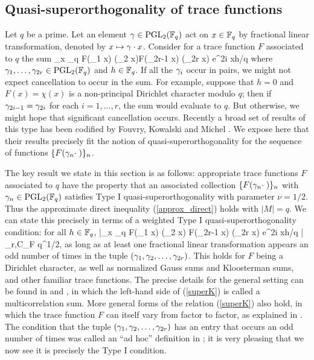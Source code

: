 \documentclass[oneside,11pt]{amsart}
\begin{document}
\subsection{Quasi-superorthogonality of trace functions}
  Let $q$ be a prime. Let an element $\gamma \in \mathrm{PGL}_2(\mathbb{F}_q)$
act on $x \in \mathbb{F}_q$ by fractional linear transformation, denoted by $x\mapsto \gamma \cdot x$. Consider for a trace function $F$ associated to $q$ the sum
\beq\label{multi}
 \sum_{x \in \F_q} F(\ga_1 \cdot x) (\ga_2 \cdot x)\cdots  F(\ga_{2r-1} \cdot x) (\ga_{2r} \cdot x)   e^{2\pi i xh/q} 
 \eeq
where $\gamma_1, \ldots, \gamma_{2r} \in  \mathrm{PGL}_2(\mathbb{F}_q)$ and $h \in \mathbb{F}_q$. 
If   all the $\gamma_i$ occur in pairs, we might not expect cancellation to occur in the sum. For example, suppose that $h=0$ and $F(x) = \chi(x)$ is a non-principal Dirichlet character modulo $q$; then if   $\gamma_{2i-1} = \gamma_{2i}$ for each $i=1,\ldots, r$, the sum would evaluate to $q$.
  But otherwise, we might hope that significant cancellation occurs. 
 Recently a broad set of results of this type has been codified by Fouvry, Kowalski and Michel \cite{FKM15}. 
We expose here that their results precisely fit the notion of quasi-superorthogonality for the sequence of functions $\{F(\gamma_n \cdot \; )\}_n$. 
  
The key result we state in this section is as follows:  appropriate  trace functions $F$ associated to $q$
have the property that an associated  collection $\{F(\gamma_n \cdot \; )\}_n$ with $\gamma_n \in \mathrm{PGL}_2(\mathbb{F}_q)$ satisfies Type I quasi-superorthogonality with parameter $\nu=1/2$. Thus the approximate direct inequality (\ref{approx_direct}) holds with $|M|=q$. 
We can state this precisely in terms of a weighted Type I quasi-superorthogonality condition:   
 for all $h \in \mathbb{F}_q$,
\beq\label{superK}
|\sum_{x \in \F_q} F(\ga_1 \cdot x) (\ga_2 \cdot x) \cdots  F(\ga_{2r-1} \cdot x) (\ga_{2r} \cdot x)   e^{2\pi i xh/q} |	\ll_{r,C_F} q^{1/2},
\eeq
 as long as at least one fractional linear transformation appears an odd number of times in the tuple $(\gamma_1,\gamma_2,\ldots, \gamma_{2r})$. 
 This holds for $F$ being a Dirichlet character, as well as normalized Gauss sums and Kloosterman sums, and other familiar trace functions. 
The precise details for the general setting can be found  in  \cite{FKM15} and \cite[\S 14]{FKMS19}, in which  the left-hand side of (\ref{superK}) is called a multicorrelation sum.  
More general forms of the relation (\ref{superK}) also hold, in which the trace function $F$ can itself vary from factor to factor, as explained in \cite{FKM15,FKMS19}.
The condition that the tuple $(\gamma_1,\gamma_2,\ldots, \gamma_{2r})$ has an entry that occurs an odd number of times  was called an ``ad hoc'' definition in \cite[Dfn. 14.2]{FKMS19}; it is very pleasing that we now see it is precisely the Type I condition.
\end{document}
